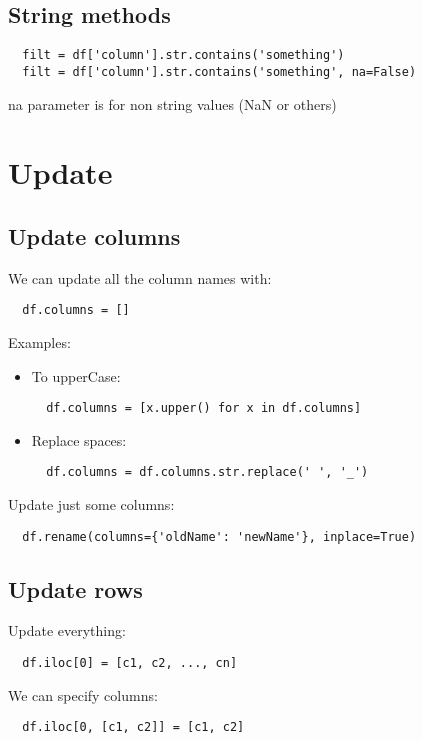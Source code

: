 \documentclass[french]{article}
\begin{document}
\subsection{String methods}

\begin{verbatim}
  filt = df['column'].str.contains('something')
  filt = df['column'].str.contains('something', na=False)
\end{verbatim}
na parameter is for non string values (NaN or others)

\section{Update}

\subsection{Update columns}
We can update all the column names with:
\begin{verbatim}
  df.columns = []
\end{verbatim}

Examples:
\begin{itemize}
\item To upperCase:
\begin{verbatim}
  df.columns = [x.upper() for x in df.columns]
\end{verbatim}

\item Replace spaces:
\begin{verbatim}
  df.columns = df.columns.str.replace(' ', '_')
\end{verbatim}
\end{itemize}

Update just some columns:
\begin{verbatim}
  df.rename(columns={'oldName': 'newName'}, inplace=True)
\end{verbatim}

\subsection{Update rows}

Update everything:
\begin{verbatim}
  df.iloc[0] = [c1, c2, ..., cn]
\end{verbatim}

We can specify columns:
\begin{verbatim}
  df.iloc[0, [c1, c2]] = [c1, c2]
\end{verbatim}
\end{document}
